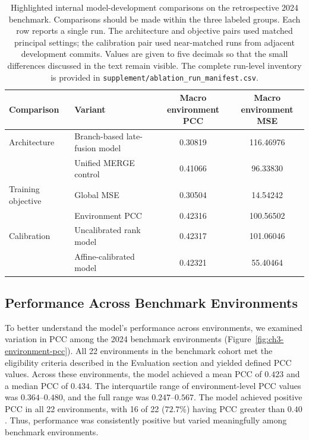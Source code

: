 \begin{table}[htbp]
    \centering
    \footnotesize
    \begin{tabular}{@{}l l c c@{}}
        \toprule
        Comparison & Variant & \makecell{Macro environment \\ PCC} & \makecell{Macro environment \\ MSE} \\
        \midrule
        Architecture & Branch-based late-fusion model & 0.30819 & 116.46976 \\
                     & Unified MERGE control & 0.41066 & 96.33830 \\
        \addlinespace
        Training objective & Global MSE & 0.30504 & 14.54242 \\
                           & Environment PCC & 0.42316 & 100.56502 \\
        \addlinespace
        Calibration & Uncalibrated rank model & 0.42317 & 101.06046 \\
                    & Affine-calibrated model & 0.42321 & 55.40464 \\
        \bottomrule
    \end{tabular}
    \caption[Internal model-development comparisons]{Highlighted internal model-development comparisons on the retrospective 2024 benchmark. Comparisons should be made within the three labeled groups. Each row reports a single run. The architecture and objective pairs used matched principal settings; the calibration pair used near-matched runs from adjacent development commits. Values are given to five decimals so that the small differences discussed in the text remain visible. The complete run-level inventory is provided in \texttt{supplement/ablation\_run\_manifest.csv}.}
    \label{tab:ch3-ablation-summary}
\end{table}

\subsection{Performance Across Benchmark Environments}
To better understand the model's performance across environments, we examined variation in PCC among the 2024 benchmark environments (Figure~\ref{fig:ch3-environment-pcc}). All 22 environments in the benchmark cohort met the eligibility criteria described in the Evaluation section and yielded defined PCC values. Across these environments, the model achieved a mean PCC of $0.423$ and a median PCC of $0.434$. The interquartile range of environment-level PCC values was $0.364$--$0.480$, and the full range was $0.247$--$0.567$. The model achieved positive PCC in all 22 environments, with 16 of 22 ($72.7\%$) having PCC greater than $0.40$. Thus, performance was consistently positive but varied meaningfully among benchmark environments.

